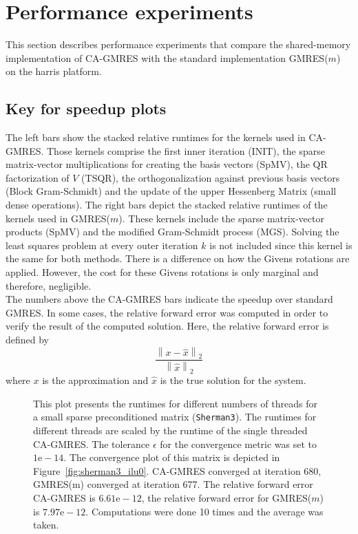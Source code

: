 \documentclass{scrartcl}
\numberwithin{equation}{section}
\newcommand{\norm}[1]{\left\lVert#1\right\rVert}
\begin{document}
\section{Performance experiments}
This section describes performance experiments that compare the shared-memory implementation of CA-GMRES with the standard implementation GMRES($m$) on the harris platform.

\subsection{Key for speedup plots}
The left bars show the stacked relative runtimes for the kernels used in CA-GMRES. Those kernels comprise the first inner iteration (INIT), the sparse matrix-vector multiplications for creating the basis vectors (SpMV), the QR factorization of $V$ (TSQR), the orthogonalization against previous basis vectors (Block Gram-Schmidt) and the update of the upper Hessenberg Matrix (small dense operations). The right bars depict the stacked relative runtimes of the kernels used in GMRES($m$). These kernels include the sparse matrix-vector products (SpMV) and the modified Gram-Schmidt process (MGS). Solving the least squares problem at every outer iteration $k$ is not included since this kernel is the same for both methods. There is a difference on how the Givens rotations are applied. However, the cost for these Givens rotations is only marginal and therefore, negligible.\\
The numbers above the CA-GMRES bars indicate the speedup over standard GMRES. In some cases, the relative forward error was computed in order to verify the result of the computed solution. Here, the relative forward error is defined by
\begin{equation*}
	\frac{\norm{x - \hat{x}}_2}{\norm{\hat{x}}_2}
\end{equation*}
where $x$ is the approximation and $\hat{x}$ is the true solution for the system.

\begin{figure}[H]\label{runtime_threads_sherman3}
	\centering
	\resizebox{0.9\textwidth}{!}{}
	\caption{This plot presents the runtimes for different numbers of threads for a small sparse preconditioned matrix (\texttt{Sherman3}). The runtimes for different threads are scaled by the runtime of the single threaded CA-GMRES. The tolerance $\epsilon$ for the convergence metric was set to $1\text{e}-14$. The convergence plot of this matrix is depicted in Figure~\ref{fig:sherman3_ilu0}. CA-GMRES converged at iteration 680, GMRES(m) converged at iteration 677. The relative forward error CA-GMRES is $6.61\text{e}-12$, the relative forward error for GMRES($m$) is $7.97\text{e}-12$. Computations were done 10 times and the average was taken.}
	\label{fig:runtimes_threads_sherman3}
\end{figure}
\end{document}

